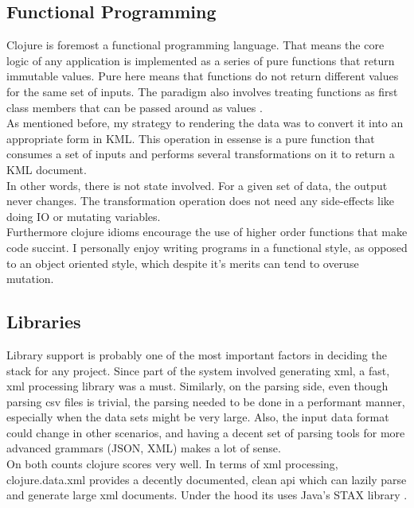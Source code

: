 \subsection{Functional Programming}

Clojure is foremost a functional programming language. That means the core logic of any application is implemented as a series of pure functions that return immutable values. Pure here means that functions do not return different values for the same set of inputs. The paradigm also involves treating functions as first class members that can be passed around as values \citep{joyofclojure}. \\

As mentioned before, my strategy to rendering the data was to convert it into an appropriate form in KML. This operation in essense is a pure function that consumes a set of inputs and performs several transformations on it to return a KML document. \\

In other words, there is not state involved. For a given set of data, the output never changes. The transformation operation does not need any side-effects like doing IO or mutating variables.\\

Furthermore clojure idioms encourage the use of higher order functions that make code succint. I personally enjoy writing programs in a functional style, as opposed to an object oriented style, which despite it's merits can tend to overuse mutation.

\subsection{Libraries}

Library support is probably one of the most important factors in deciding the stack for any project. Since part of the system involved generating xml, a fast, xml processing library was a must. Similarly, on the parsing side, even though parsing csv files is trivial, the parsing needed to be done in a performant manner, especially when the data sets might be very large. Also, the input data format could change in other scenarios, and having a decent set of parsing tools for more advanced grammars (JSON, XML) makes a lot of sense.\\

On both counts clojure scores very well. In terms of xml processing, clojure.data.xml provides  a decently documented, clean api which can lazily parse and generate large xml documents. Under the hood its uses Java's STAX library \citep{clojure:data.xml}.\\

